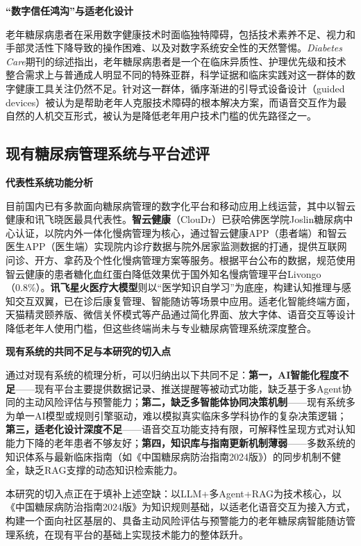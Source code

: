 \noindent\textbf{``数字信任鸿沟''与适老化设计}

老年糖尿病患者在采用数字健康技术时面临独特障碍，包括技术素养不足、视力和手部灵活性下降导致的操作困难、以及对数字系统安全性的天然警惕。\emph{Diabetes Care}期刊的综述指出，老年糖尿病患者是一个在临床异质性、护理优先级和技术整合需求上与普通成人明显不同的特殊亚群，科学证据和临床实践对这一群体的数字健康工具关注仍然不足。针对这一群体，循序渐进的引导式设备设计（guided devices）被认为是帮助老年人克服技术障碍的根本解决方案，而语音交互作为最自然的人机交互形式，被认为是降低老年用户技术门槛的优先路径之一\todocite{}\todocite{}\todocite{}。

\subsection{现有糖尿病管理系统与平台述评}

\noindent\textbf{代表性系统功能分析}

目前国内已有多款面向糖尿病管理的数字化平台和移动应用上线运营，其中以智云健康和讯飞晓医最具代表性。\textbf{智云健康}（ClouDr）已获哈佛医学院Joslin糖尿病中心认证，以院内外一体化慢病管理为核心，通过智云健康APP（患者端）和智云医生APP（医生端）实现院内诊疗数据与院外居家监测数据的打通，提供互联网问诊、开方、拿药及个性化慢病管理方案等服务。根据平台公布的数据，规范使用智云健康的患者糖化血红蛋白降低效果优于国外知名慢病管理平台Livongo（0.8\%）。\textbf{讯飞星火医疗大模型}则以``医学知识自学习''为底座，构建认知推理与感知交互双翼，已在诊后康复管理、智能随访等场景中应用。适老化智能终端方面，天猫精灵颐养版、微信关怀模式等产品通过简化界面、放大字体、语音交互等设计降低老年人使用门槛，但这些终端尚未与专业糖尿病管理系统深度整合\todocite{}\todocite{}\todocite{}。

\noindent\textbf{现有系统的共同不足与本研究的切入点}

通过对现有系统的梳理分析，可以归纳出以下共同不足：\textbf{第一，AI智能化程度不足}------现有平台主要提供数据记录、推送提醒等被动式功能，缺乏基于多Agent协同的主动风险评估与预警能力；\textbf{第二，缺乏多智能体协同决策机制}------现有系统多为单一AI模型或规则引擎驱动，难以模拟真实临床多学科协作的复杂决策逻辑；\textbf{第三，适老化设计深度不足}------语音交互功能支持有限，可解释性呈现方式对认知能力下降的老年患者不够友好；\textbf{第四，知识库与指南更新机制薄弱}------多数系统的知识体系与最新临床指南（如《中国糖尿病防治指南2024版》）的同步机制不健全，缺乏RAG支撑的动态知识检索能力。

本研究的切入点正在于填补上述空缺：以LLM+多Agent+RAG为技术核心，以《中国糖尿病防治指南2024版》为知识规则基础，以适老化语音交互为接入方式，构建一个面向社区基层的、具备主动风险评估与预警能力的老年糖尿病智能随访管理系统，在现有平台的基础上实现技术能力的整体跃升。



